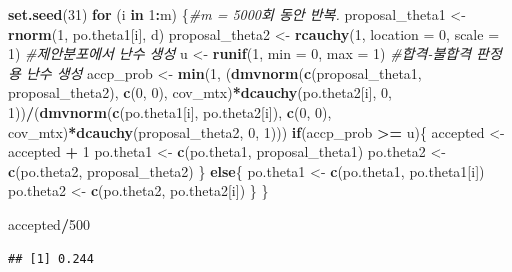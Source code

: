 \documentclass[
]{article}
\newenvironment{Shaded}{\begin{snugshade}}{\end{snugshade}}
\newcommand{\AttributeTok}[1]{\textcolor[rgb]{0.13,0.29,0.53}{#1}}
\newcommand{\CommentTok}[1]{\textcolor[rgb]{0.56,0.35,0.01}{\textit{#1}}}
\newcommand{\ControlFlowTok}[1]{\textcolor[rgb]{0.13,0.29,0.53}{\textbf{#1}}}
\newcommand{\DecValTok}[1]{\textcolor[rgb]{0.00,0.00,0.81}{#1}}
\newcommand{\FunctionTok}[1]{\textcolor[rgb]{0.13,0.29,0.53}{\textbf{#1}}}
\newcommand{\NormalTok}[1]{#1}
\newcommand{\OtherTok}[1]{\textcolor[rgb]{0.56,0.35,0.01}{#1}}
\newcommand{\SpecialCharTok}[1]{\textcolor[rgb]{0.81,0.36,0.00}{\textbf{#1}}}
\begin{document}
\begin{Shaded}
\begin{Highlighting}[]
\FunctionTok{set.seed}\NormalTok{(}\DecValTok{31}\NormalTok{)}
\ControlFlowTok{for}\NormalTok{ (i }\ControlFlowTok{in} \DecValTok{1}\SpecialCharTok{:}\NormalTok{m) \{}\CommentTok{\#m = 5000회 동안 반복.}
\NormalTok{  proposal\_theta1 }\OtherTok{\textless{}{-}} \FunctionTok{rnorm}\NormalTok{(}\DecValTok{1}\NormalTok{, po.theta1[i], d)}
\NormalTok{  proposal\_theta2 }\OtherTok{\textless{}{-}} \FunctionTok{rcauchy}\NormalTok{(}\DecValTok{1}\NormalTok{, }\AttributeTok{location =} \DecValTok{0}\NormalTok{, }\AttributeTok{scale =} \DecValTok{1}\NormalTok{) }\CommentTok{\#제안분포에서 난수 생성}
\NormalTok{  u }\OtherTok{\textless{}{-}} \FunctionTok{runif}\NormalTok{(}\DecValTok{1}\NormalTok{, }\AttributeTok{min =} \DecValTok{0}\NormalTok{, }\AttributeTok{max =} \DecValTok{1}\NormalTok{) }\CommentTok{\#합격{-}불합격 판정용 난수 생성}
\NormalTok{  accp\_prob }\OtherTok{\textless{}{-}} \FunctionTok{min}\NormalTok{(}\DecValTok{1}\NormalTok{, (}\FunctionTok{dmvnorm}\NormalTok{(}\FunctionTok{c}\NormalTok{(proposal\_theta1, proposal\_theta2), }\FunctionTok{c}\NormalTok{(}\DecValTok{0}\NormalTok{, }\DecValTok{0}\NormalTok{), cov\_mtx)}\SpecialCharTok{*}\FunctionTok{dcauchy}\NormalTok{(po.theta2[i], }\DecValTok{0}\NormalTok{, }\DecValTok{1}\NormalTok{))}\SpecialCharTok{/}\NormalTok{(}\FunctionTok{dmvnorm}\NormalTok{(}\FunctionTok{c}\NormalTok{(po.theta1[i], po.theta2[i]), }\FunctionTok{c}\NormalTok{(}\DecValTok{0}\NormalTok{, }\DecValTok{0}\NormalTok{), cov\_mtx)}\SpecialCharTok{*}\FunctionTok{dcauchy}\NormalTok{(proposal\_theta2, }\DecValTok{0}\NormalTok{, }\DecValTok{1}\NormalTok{)))}
  \ControlFlowTok{if}\NormalTok{(accp\_prob }\SpecialCharTok{\textgreater{}=}\NormalTok{ u)\{}
\NormalTok{    accepted }\OtherTok{\textless{}{-}}\NormalTok{ accepted }\SpecialCharTok{+} \DecValTok{1}
\NormalTok{    po.theta1 }\OtherTok{\textless{}{-}} \FunctionTok{c}\NormalTok{(po.theta1, proposal\_theta1)}
\NormalTok{    po.theta2 }\OtherTok{\textless{}{-}} \FunctionTok{c}\NormalTok{(po.theta2, proposal\_theta2)}
\NormalTok{  \} }\ControlFlowTok{else}\NormalTok{\{}
\NormalTok{    po.theta1 }\OtherTok{\textless{}{-}} \FunctionTok{c}\NormalTok{(po.theta1, po.theta1[i])}
\NormalTok{    po.theta2 }\OtherTok{\textless{}{-}} \FunctionTok{c}\NormalTok{(po.theta2, po.theta2[i])}
\NormalTok{  \}}
\NormalTok{\}}

\NormalTok{accepted}\SpecialCharTok{/}\DecValTok{500}
\end{Highlighting}
\end{Shaded}

\begin{verbatim}
## [1] 0.244
\end{verbatim}
\end{document}

